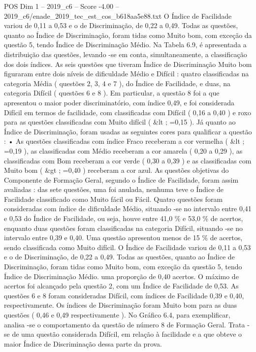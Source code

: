 \begin{textsample}{POS Dim 1 – 2019\_c6 – Score -4.00 – 2019\_c6/enade\_2019\_tec\_est\_cos\_b618aa5e88.txt}
O Índice de Facilidade variou de 0,11 a 0,53 e o de Discriminação, de 0,22 a 0,49.
Todas as questões, quanto ao Índice de Discriminação, foram tidas como Muito bom, com exceção da questão 5, tendo Índice de Discriminação Médio.
Na Tabela 6.9, é apresentada a distribuição das questões, levando -se em conta, simultaneamente, a classificação dos dois índices.
As seis questões que tiveram Índice de Discriminação Muito bom figuraram entre dois níveis de dificuldade Médio e Difícil : quatro classificadas na categoria Média ( questões 2, 3, 4 e 7 ), do Índice de Facilidade, e duas, na categoria Difícil ( questões 6 e 8 ).
Em particular, a questão 8 foi a que apresentou o maior poder discriminatório, com índice 0,49, e foi considerada Difícil em termos de facilidade, com classificadas com Difícil ( 0,16 a 0,40 ) e roxo para as questões classificadas com Muito difícil ( \&lt ; =0,15 ).
Já quanto ao Índice de Discriminação, foram usadas as seguintes cores para qualificar a questão : • As questões classificadas com índice Fraco receberam a cor vermelha ( \&lt ; =0,19 ), as classificadas com Médio receberam a cor amarela ( 0,20 a 0,29 ), as classificadas com Bom receberam a cor verde ( 0,30 a 0,39 ) e as classificadas com Muito bom ( \&gt ; =0,40 ) receberam a cor azul.
As questões objetivas do Componente de Formação Geral, segundo o Índice de Facilidade, foram assim avaliadas : das sete questões, uma foi anulada, nenhuma teve o Índice de Facilidade classificado como Muito fácil ou Fácil.
Quatro questões foram consideradas com índice de dificuldade Médio, situando -se no intervalo entre 0,41 e 0,53 do Índice de Facilidade, ou seja, houve entre 41,0 \% e 53,0 \% de acertos, enquanto duas questões foram classificadas na categoria Difícil, situando -se no intervalo entre 0,39 e 0,40.
Uma questão apresentou menos de 15 \% de acertos, sendo classificada como Muito difícil.
O Índice de Facilidade variou de 0,11 a 0,53 e o de Discriminação, de 0,22 a 0,49.
Todas as questões, quanto ao Índice de Discriminação, foram tidas como Muito bom, com exceção da questão 5, tendo Índice de Discriminação Médio. uma proporção de 0,40 acertos.
O máximo de acertos foi alcançado pela questão 2, com um Índice de Facilidade de 0,53.
As questões 6 e 8 foram consideradas Difícil, com índices de Facilidade 0,39 e 0,40, respectivamente.
Os índices de Discriminação foram Muito bom para as duas questões ( 0,46 e 0,49 respectivamente ).
No Gráfico 6.4, para exemplificar, analisa -se o comportamento da questão de número 8 de Formação Geral.
Trata -se de uma questão considerada Difícil, em relação à facilidade e a que obteve o maior Índice de Discriminação dessa parte da prova.

\end{textsample}
